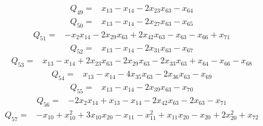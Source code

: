 \begin{equation*}\begin{aligned}
Q_{49}={}& x_{13}-x_{14}-2x_{23}x_{63}-x_{64}
\end{aligned}\end{equation*}
\begin{equation*}\begin{aligned}
Q_{50}={}& x_{13}-x_{14}-2x_{27}x_{63}-x_{65}
\end{aligned}\end{equation*}
\begin{equation*}\begin{aligned}
Q_{51}={}& -x_{2}x_{14}-2x_{29}x_{63}+2x_{42}x_{63}-x_{63}-x_{66}+x_{71}
\end{aligned}\end{equation*}
\begin{equation*}\begin{aligned}
Q_{52}={}& x_{13}-x_{14}-2x_{31}x_{63}-x_{67}
\end{aligned}\end{equation*}
\begin{equation*}\begin{aligned}
Q_{53}={}& x_{13}-x_{14}+2x_{23}x_{63}-2x_{29}x_{63}-2x_{33}x_{63}+x_{64}-x_{66}-x_{68}
\end{aligned}\end{equation*}
\begin{equation*}\begin{aligned}
Q_{54}={}& x_{13}-x_{14}-4x_{35}x_{63}-2x_{36}x_{63}-x_{69}
\end{aligned}\end{equation*}
\begin{equation*}\begin{aligned}
Q_{55}={}& x_{13}-x_{14}-2x_{39}x_{63}-x_{70}
\end{aligned}\end{equation*}
\begin{equation*}\begin{aligned}
Q_{56}={}& -2x_{2}x_{14}+x_{13}-x_{14}-2x_{42}x_{63}-2x_{63}-x_{71}
\end{aligned}\end{equation*}
\begin{equation*}\begin{aligned}
Q_{57}={}& -x_{10}+x_{10}^{2}+3x_{10}x_{20}-x_{11}-x_{11}^{2}+x_{11}x_{20}-x_{20}+2x_{20}^{2}+x_{72}
\end{aligned}\end{equation*}
